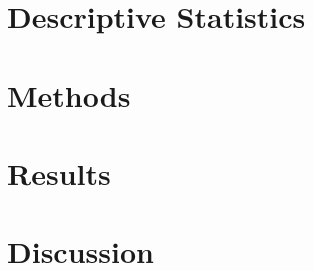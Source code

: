 \documentclass{article}
\begin{document}
\section{Descriptive Statistics}
\section{Methods}
\section{Results}
\section{Discussion}

\printbibliography
\end{document}
